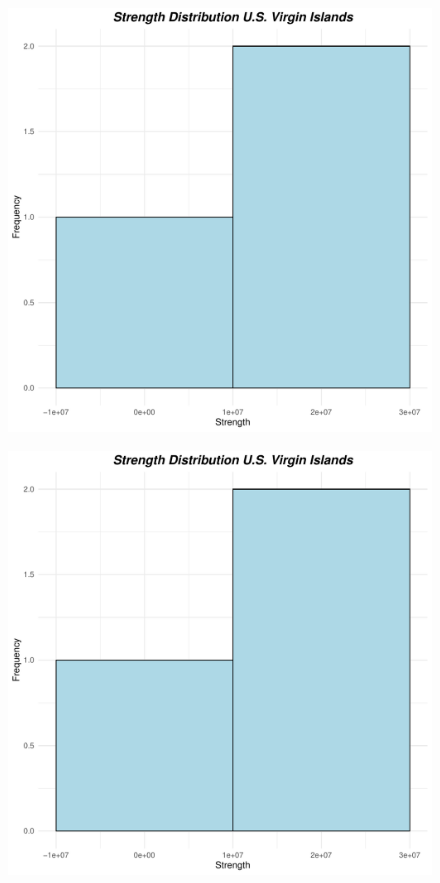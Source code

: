 \begin{figure}[h]
\begin{minipage}[t]{0.4\linewidth}
\centering
\includegraphics[width=\textwidth, page=45]{images/task1/strenght_plots.pdf} 
    \label{Texas:strength}
\end{minipage}
\hfill
\begin{minipage}[t]{0.4\linewidth}
\includegraphics[width=\textwidth, page=48]{images/task1/strenght_plots.pdf} 
    \label{Virginia:strength}
\end{minipage}



\end{figure}
